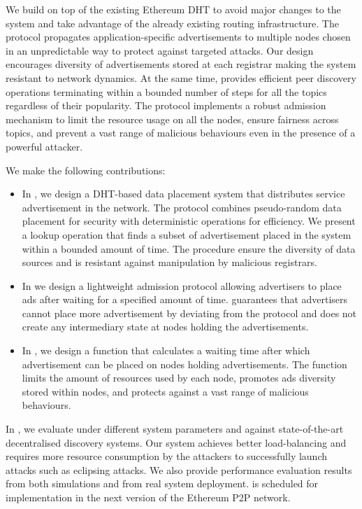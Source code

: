 We build \sysname on top of the existing Ethereum DHT to avoid major changes to the system and take advantage of the already existing routing infrastructure. The protocol propagates application-specific advertisements to multiple nodes chosen in an unpredictable way to protect against targeted attacks. Our design encourages diversity of advertisements stored at each registrar making the system resistant to network dynamics. At the same time, \sysname provides efficient peer discovery operations terminating within a bounded number of steps for all the topics regardless of their popularity. The protocol implements a robust admission mechanism to limit the resource usage on all the nodes, ensure fairness across topics, and prevent a vast range of malicious behaviours even in the presence of a powerful attacker.

 We make the following contributions:
\begin{itemize}
    \item In , we design a DHT-based data placement system that distributes service advertisement in the network. The protocol combines pseudo-random data placement for security with deterministic operations for efficiency. We present a lookup operation that finds a subset of advertisement placed in the system within a bounded amount of time. The procedure ensure the diversity of data sources and is resistant against manipulation by malicious registrars. 
    \item In  we design a lightweight admission protocol allowing advertisers to place ads after waiting for a specified amount of time. \sysname guarantees that advertisers cannot place more advertisement by deviating from the protocol and does not create any intermediary state at nodes holding the advertisements. 
    \item In , we design a function that calculates a waiting time after which advertisement can be placed on nodes holding advertisements. The function limits the amount of resources used by each node, promotes ads diversity stored within nodes, and protects against a vast range of malicious behaviours. 
\end{itemize}

In , we evaluate \sysname under different system parameters and against state-of-the-art decentralised discovery systems. Our system achieves better load-balancing and requires more resource consumption by the attackers to successfully launch attacks such as eclipsing attacks. We also provide performance evaluation results from both simulations and from real system deployment. \sysname is scheduled for implementation in the next version of the Ethereum P2P network. 

